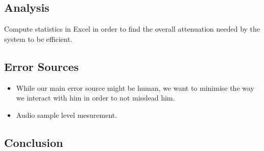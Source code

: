 \subsection{Analysis}
Compute statistics in Excel in order to find the overall attenuation needed by the system to be efficient.

\subsection{Error Sources}
\begin{itemize}
\item While our main error source might be human, we want to minimise the way we interact with him in order to not misslead him.
\item Audio sample level mesurement.
\end{itemize}

\vspace{1cm}
\subsection{Conclusion}


